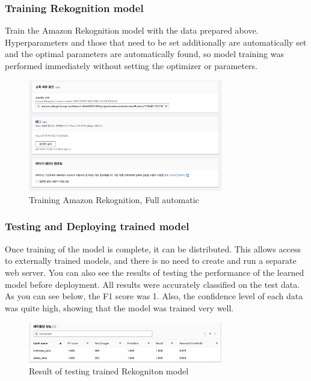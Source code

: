 \subsubsection{\textbf{Training Rekognition model}}
Train the Amazon Rekognition model with the data prepared above. Hyperparameters and those that need to be set additionally are automatically set and the optimal parameters are automatically found, so model training was performed immediately without setting the optimizer or parameters.


\begin{figure}[h]
    \centering
    \includegraphics[width=8.5cm]{images/rek_training.png}
    \caption{Training Amazon Rekognition, Full automatic}
\end{figure}


\subsubsection{\textbf{Testing and Deploying trained model}}

Once training of the model is complete, it can be distributed. This allows access to externally trained models, and there is no need to create and run a separate web server. You can also see the results of testing the performance of the learned model before deployment. All results were accurately classified on the test data. As you can see below, the F1 score was 1. Also, the confidence level of each data was quite high, showing that the model was trained very well.
\begin{figure}[h!]
    \centering
    \includegraphics[width=8.5cm]{images/rek_result.png}
    \caption{Result of testing trained Rekogniton model}
\end{figure}


